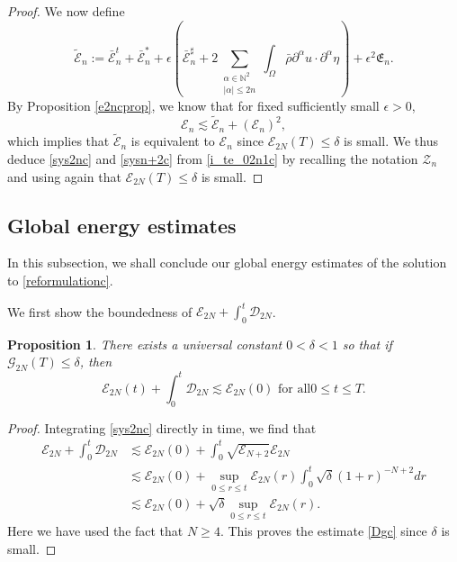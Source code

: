 \documentclass[a4paper,reqno,11pt]{amsart}
\numberwithin{equation}{section}
\providecommand{\se}[1]{\mathcal{E}_{#1}}
\newtheorem{prop}[lem]{Proposition}
\begin{document}
\begin{proof}
We now define
\begin{equation}
\tilde{ \mathcal{E}}_{n}:=\bar{\mathcal{E}}_{n}^t+ \bar{\mathcal{E}}_{n}^*+\epsilon\left( \bar{\mathcal{E}}_{n}^\sharp+2\sum_{\substack{{\alpha}\in \mathbb{N}^2\\  |{\alpha}|\le 2n}}\int_\Omega \bar\rho \partial^\alpha     u  \cdot \partial^\alpha  \eta\right)+\epsilon^2 \mathfrak{E}_{n}.
\end{equation}
By Proposition \ref{e2ncprop}, we know that for fixed sufficiently small $\epsilon>0$,
\begin{equation}
\mathcal{E}_{n}{\lesssim} \tilde{ \mathcal{E}}_{n}+(\mathcal{E}_{n} )^{2},
\end{equation}
which implies that $\tilde{ \mathcal{E}}_{n}$ is equivalent to $ \mathcal{E}_{n}$ since ${\mathcal{E}}_{2N} (T)\le \delta$ is small. We thus deduce \eqref{sys2nc} and \eqref{sysn+2c} from \eqref{i_te_02n1c} by recalling the notation $\mathcal{Z}_n$ and using again that ${\mathcal{E}}_{2N} (T)\le \delta$ is small.
\end{proof}

\subsection{Global energy estimates}

In this subsection, we shall conclude our global energy estimates of the solution to \eqref{reformulationc}.

 We first show the boundedness of $\mathcal{E}_{2N} +\int_0^t\mathcal{D}_{2N} $.

\begin{prop} \label{Dglec}
There exists a universal constant $0<\delta<1$ so that if $\mathcal{G}_{2N}(T)\le\delta$, then
\begin{equation}\label{Dgc}
\mathcal{E}_{2N} (t)+\int_0^t\mathcal{D}_{2N} \lesssim
\mathcal{E}_{2N} (0)    \text{ for all
}0\le t\le T.
\end{equation}
\end{prop}
\begin{proof}
Integrating \eqref{sys2nc} directly in time, we find that
\begin{equation}
\begin{split}
    {\mathcal{E}}_{2N}
+ \int_0^t{\mathcal{D}}_{2N}
&{\lesssim} {\mathcal{E}}_{2N}(0)+\int_0^t \sqrt{ \se{N+2}  }  \mathcal{E}_{2N}
\\& {\lesssim} {\mathcal{E}}_{2N}(0)+\sup_{0\le r\le t}\mathcal{E}_{2N}(r)
 \int_0^t \sqrt{\delta}(1+r)^{-N+2}dr
 \\& {\lesssim} {\mathcal{E}}_{2N}(0)+\sqrt{\delta}\sup_{0\le r\le t}\mathcal{E}_{2N}(r).
 \end{split}
\end{equation}
Here we have used the fact that $N\ge 4$. This proves the estimate \eqref{Dgc} since $\delta$ is small.
\end{proof}
\end{document}
